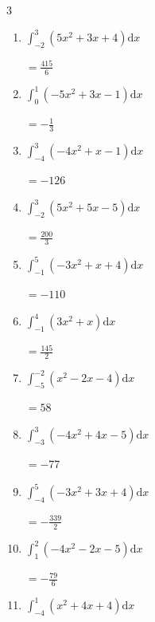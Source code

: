 \begin{multicols}{3}
\begin{enumerate}
        $\displaystyle =-\frac{539}{2}$

  \item $\displaystyle \int_{-2}^{3}\left( 5x^{2}+3x+4 \right) \mathrm{d}x$

        $\displaystyle =\frac{415}{6}$

  \item $\displaystyle \int_{0}^{1}\left( -5x^{2}+3x-1 \right) \mathrm{d}x$

        $\displaystyle =-\frac{1}{3}$

  \item $\displaystyle \int_{-4}^{3}\left( -4x^{2}+x-1 \right) \mathrm{d}x$

        $\displaystyle =-126$

  \item $\displaystyle \int_{-2}^{3}\left( 5x^{2}+5x-5 \right) \mathrm{d}x$

        $\displaystyle =\frac{200}{3}$

\columnbreak %

  \item $\displaystyle \int_{-1}^{5}\left( -3x^{2}+x+4 \right) \mathrm{d}x$

        $\displaystyle =-110$

  \item $\displaystyle \int_{-1}^{4}\left( 3x^{2}+x \right) \mathrm{d}x$

        $\displaystyle =\frac{145}{2}$

  \item $\displaystyle \int_{-5}^{-2}\left( x^{2}-2x-4 \right) \mathrm{d}x$

        $\displaystyle =58$

  \item $\displaystyle \int_{-3}^{3}\left( -4x^{2}+4x-5 \right) \mathrm{d}x$

        $\displaystyle =-77$

  \item $\displaystyle \int_{-4}^{5}\left( -3x^{2}+3x+4 \right) \mathrm{d}x$

        $\displaystyle =-\frac{339}{2}$

\columnbreak %

  \item $\displaystyle \int_{1}^{2}\left( -4x^{2}-2x-5 \right) \mathrm{d}x$

        $\displaystyle =-\frac{79}{6}$

  \item $\displaystyle \int_{-4}^{1}\left( x^{2}+4x+4 \right) \mathrm{d}x$


\end{enumerate}
\end{multicols}
